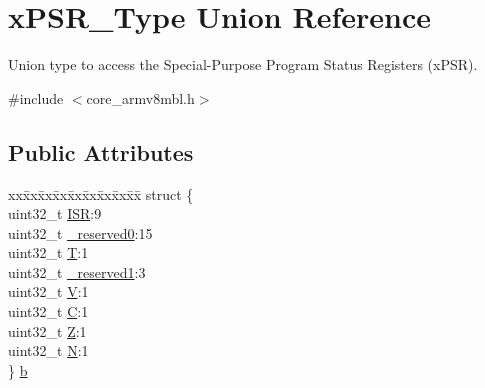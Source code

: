 \hypertarget{unionx_p_s_r___type}{}\section{x\+P\+S\+R\+\_\+\+Type Union Reference}
\label{unionx_p_s_r___type}


Union type to access the Special-\/\+Purpose Program Status Registers (x\+P\+SR).  




{\ttfamily \#include $<$core\+\_\+armv8mbl.\+h$>$}

\subsection*{Public Attributes}
\begin{DoxyCompactItemize}
\item 
\begin{tabbing}
xx\=xx\=xx\=xx\=xx\=xx\=xx\=xx\=xx\=\kill
struct \{\\
\>uint32\_t \mbox{\hyperlink{unionx_p_s_r___type_a3e9120dcf1a829fc8d2302b4d0673970}{ISR}}:9\\
\>uint32\_t \mbox{\hyperlink{unionx_p_s_r___type_af438e0f407357e914a70b5bd4d6a97c5}{\_reserved0}}:15\\
\>uint32\_t \mbox{\hyperlink{unionx_p_s_r___type_a7eed9fe24ae8d354cd76ae1c1110a658}{T}}:1\\
\>uint32\_t \mbox{\hyperlink{unionx_p_s_r___type_a790056bb6f20ea16cecc784b0dd19ad6}{\_reserved1}}:3\\
\>uint32\_t \mbox{\hyperlink{unionx_p_s_r___type_af14df16ea0690070c45b95f2116b7a0a}{V}}:1\\
\>uint32\_t \mbox{\hyperlink{unionx_p_s_r___type_a40213a6b5620410cac83b0d89564609d}{C}}:1\\
\>uint32\_t \mbox{\hyperlink{unionx_p_s_r___type_a1e5d9801013d5146f2e02d9b7b3da562}{Z}}:1\\
\>uint32\_t \mbox{\hyperlink{unionx_p_s_r___type_a2db9a52f6d42809627d1a7a607c5dbc5}{N}}:1\\
\} \mbox{\hyperlink{unionx_p_s_r___type_a3b1063bb5cdad67e037cba993b693b70}{b}}\\


\end{tabbing}
\end{DoxyCompactItemize}
